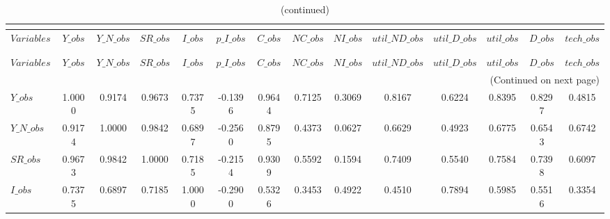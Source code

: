  
\begin{center}
\begin{longtable}{lccccccccccccc} 
\caption{MATRIX OF CORRELATIONS}\\
 \label{Table:th_corr_matrix}\\
\toprule 
$Variables      $	 & 	 $          Y\_obs$	 & 	 $      Y\_N\_obs$	 & 	 $         SR\_obs$	 & 	 $          I\_obs$	 & 	 $      p\_I\_obs$	 & 	 $          C\_obs$	 & 	 $         NC\_obs$	 & 	 $         NI\_obs$	 & 	 $  util\_ND\_obs$	 & 	 $   util\_D\_obs$	 & 	 $       util\_obs$	 & 	 $          D\_obs$	 & 	 $       tech\_obs$\\
\midrule \endfirsthead 
\caption{(continued)}\\
 \toprule \\ 
$Variables      $	 & 	 $          Y\_obs$	 & 	 $      Y\_N\_obs$	 & 	 $         SR\_obs$	 & 	 $          I\_obs$	 & 	 $      p\_I\_obs$	 & 	 $          C\_obs$	 & 	 $         NC\_obs$	 & 	 $         NI\_obs$	 & 	 $  util\_ND\_obs$	 & 	 $   util\_D\_obs$	 & 	 $       util\_obs$	 & 	 $          D\_obs$	 & 	 $       tech\_obs$\\
\midrule \endhead 
\midrule \multicolumn{14}{r}{(Continued on next page)} \\ \bottomrule \endfoot 
\bottomrule \endlastfoot 
$Y\_obs         $	 & 	           1.0000	 & 	           0.9174	 & 	           0.9673	 & 	           0.7375	 & 	          -0.1396	 & 	           0.9644	 & 	           0.7125	 & 	           0.3069	 & 	           0.8167	 & 	           0.6224	 & 	           0.8395	 & 	           0.8297	 & 	           0.4815 \\ 
$Y\_N\_obs      $	 & 	           0.9174	 & 	           1.0000	 & 	           0.9842	 & 	           0.6897	 & 	          -0.2560	 & 	           0.8795	 & 	           0.4373	 & 	           0.0627	 & 	           0.6629	 & 	           0.4923	 & 	           0.6775	 & 	           0.6543	 & 	           0.6742 \\ 
$SR\_obs        $	 & 	           0.9673	 & 	           0.9842	 & 	           1.0000	 & 	           0.7185	 & 	          -0.2154	 & 	           0.9309	 & 	           0.5592	 & 	           0.1594	 & 	           0.7409	 & 	           0.5540	 & 	           0.7584	 & 	           0.7398	 & 	           0.6097 \\ 
$I\_obs         $	 & 	           0.7375	 & 	           0.6897	 & 	           0.7185	 & 	           1.0000	 & 	          -0.2900	 & 	           0.5326	 & 	           0.3453	 & 	           0.4922	 & 	           0.4510	 & 	           0.7894	 & 	           0.5985	 & 	           0.5516	 & 	           0.3354 \\ 

\end{longtable}
\end{center}
